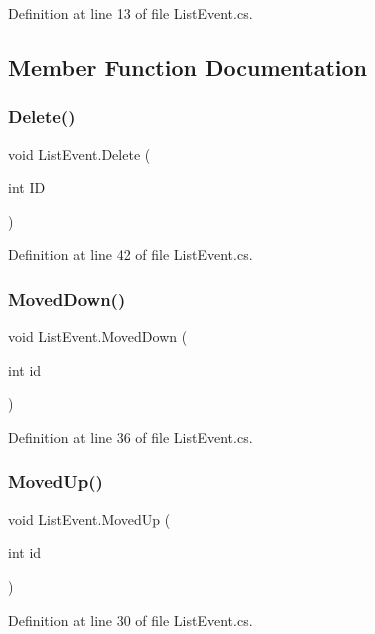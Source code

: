 Definition at line 13 of file List\+Event.\+cs.



\subsection{Member Function Documentation}
\mbox{\label{class_list_event_a1034240ef2e966e4a5428c5812ea51de}} 
\subsubsection{Delete()}
{\footnotesize\ttfamily void List\+Event.\+Delete (\begin{DoxyParamCaption}\item[{int}]{ID }\end{DoxyParamCaption})}



Definition at line 42 of file List\+Event.\+cs.

\mbox{\label{class_list_event_a4f12cf0578afccf5a70f228ce7d96d1f}} 
\subsubsection{Moved\+Down()}
{\footnotesize\ttfamily void List\+Event.\+Moved\+Down (\begin{DoxyParamCaption}\item[{int}]{id }\end{DoxyParamCaption})}



Definition at line 36 of file List\+Event.\+cs.

\mbox{\label{class_list_event_aaabcce127e697b65f6d2e450700f0325}} 
\subsubsection{Moved\+Up()}
{\footnotesize\ttfamily void List\+Event.\+Moved\+Up (\begin{DoxyParamCaption}\item[{int}]{id }\end{DoxyParamCaption})}



Definition at line 30 of file List\+Event.\+cs.

